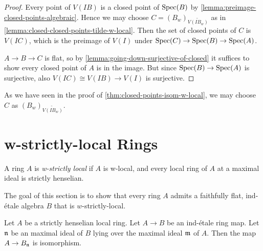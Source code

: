 \begin{proof}
    Every point of $V(IB)$ is a closed point of $\mathrm{Spec}(B)$ by \ref{lemma:preimage-closed-points-algebraic}.
    Hence we may choose $C = (B_w)_{\widetilde{V(IB_w)}}$ as in \ref{lemma:closed-closed-points-tilde-w-local}. Then
    the set of closed points of $C$ is $V(IC)$, which is the preimage of $V(I)$ under
    $\mathrm{Spec}(C) \to \mathrm{Spec}(B) \to \mathrm{Spec}(A)$.

    $A \to B \to C$ is flat, so by \ref{lemma:going-down-surjective-of-closed} it suffices
    to show every closed point of $A$ is in the image. But since $\mathrm{Spec}(B) \to \mathrm{Spec}(A)$ is surjective,
    also $V(IC) \cong V(IB) \to V(I)$ is surjective.
\end{proof}

\begin{remark}
    As we have seen in the proof of \ref{thm:closed-points-isom-w-local}, we may choose
    $C$ as $(B_w)_{\widetilde{V(IB_w)}}$.
\end{remark}

\section{w-strictly-local Rings}

\begin{definition}
    A ring \(A\) is \emph{w-strictly local} if \(A\) is w-local, and every local ring of \(A\) at a maximal ideal is strictly henselian.
    \label{def:w-strictly-local-ring}
\end{definition}

The goal of this section is to show that every ring $A$ admits a faithfully flat, ind-étale algebra $B$ that is $w$-strictly-local.

\begin{lemma}
  \label{thm:ind-etale-strictly-henselian-localization-isom}
  Let \(A\) be a strictly henselian local ring. Let \(A \to B\) be an ind-étale ring map. Let ${\mathfrak{n}}$ be an maximal ideal of $B$ lying over the maximal ideal ${\mathfrak{m}}$ of $A$. Then the map $A \to B_{\mathfrak{n}}$ is isomorphism.
\end{lemma}

